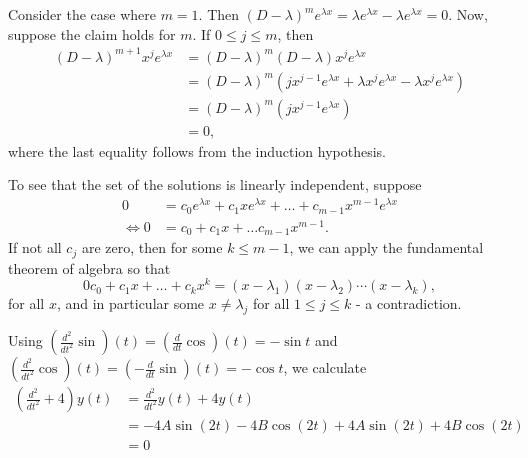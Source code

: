 \documentclass{homework}
\begin{document}

\enlargethispage{2em}
\begin{solution}
  Consider the case where $m=1$. Then $(D - \lambda)^m e^{\lambda x} = \lambda e^{\lambda x} - \lambda e^{\lambda x} = 0$.  Now, suppose the claim holds for $m$. If $0\le j \le m$, then
  \begin{align*}
    (D-\lambda)^{m+1} x^je^{\lambda x} 
    &= (D - \lambda)^m(D - \lambda) x^j e^{\lambda x}\\
    &= (D - \lambda)^m(j x^{j-1} e^{\lambda x} +\lambda x^je^{\lambda x} - \lambda x^je^{\lambda x})\\
    &= (D - \lambda)^m(j x^{j-1} e^{\lambda x})\\
    &= 0, 
  \end{align*}
  where the last equality follows from the induction hypothesis.

  To see that the set of the solutions is linearly independent, suppose
  \begin{align*}
    0 &= c_0 e^{\lambda x} + c_1 x e^{\lambda x} + \dots + c_{m-1} x^{m-1} e^{\lambda x} \\
    \iff 0 &= c_0 + c_1 x+ \dots c_{m-1}x^{m-1}. 
  \end{align*}
  If not all $c_j$ are zero, then for some $k\le m-1$, we can apply the fundamental theorem of algebra so that
  $$
  0 c_0 + c_1 x + \dots + c_k x^k = (x - \lambda_1)(x - \lambda_2)\cdots(x - \lambda_k),
  $$
  for all $x$, and in particular some $x \not= \lambda_j$ for all $1\le j\le k$ - a contradiction. 
  
\end{solution}



Using $(\frac{d^2}{dt^2}\sin)(t) = (\frac d{dt}\cos)(t) = -\sin t$ and $(\frac{d^2}{dt^2}\cos)(t) = (-\frac d{dt}\sin)(t) = -\cos t$, we calculate 
\begin{align*}
  \left(\frac{d^2}{dt^2} + 4\right)y(t) 
  &= \frac{d^2}{dt^2}y(t) + 4y(t)\\
  &= -4A\sin(2t) - 4B\cos(2t) + 4A\sin(2t) + 4B\cos(2t) \\
  &=0
\end{align*}
\end{document}
